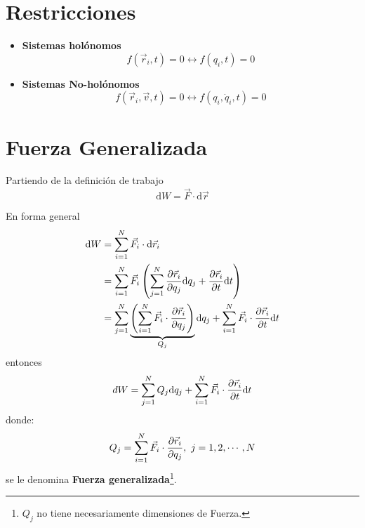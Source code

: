 \documentclass[../main]{subfiles}
\begin{document}
\section{Restricciones}\label{sec5}
\begin{itemize}
    \item \textbf{Sistemas holónomos}
    \begin{equation}
        f(\vec{r}_i, t)=0 \leftrightarrow f(q_i, t)=0
    \end{equation}
    \item \textbf{Sistemas No-holónomos}
    \begin{equation}
        f(\vec{r}_i, \vec{v}, t)=0 \leftrightarrow f(q_i, \dot{q}_i, t)=0
    \end{equation}
\end{itemize}

\section{Fuerza Generalizada}\label{sec6}

Partiendo de la definición de trabajo
\begin{equation}
    \mathrm{d}W=\vec{F}\cdot \mathrm{d}\vec{r}
\end{equation}

En forma general
\begin{equation}
    \begin{split}
        \mathrm{d}W&=\sum_{i=1}^N \vec{F}_i \cdot \mathrm{d}\vec{r}_i \\
        &=\sum_{i=1}^N \vec{F}_i \left(\sum_{j=1}^N \pdv{\vec{r}_i}{q_j}\mathrm{d}q_j+\pdv{\vec{r}_i}{t}\mathrm{d}t\right)\\
        &=\sum_{j=1}^N \underbrace{\left(\sum_{i=1}^N \vec{F}_i \cdot \pdv{\vec{r}_i}{q_j}\right)}_{Q_j}\mathrm{d}q_j+\sum_{i=1}^N \vec{F}_i \cdot \pdv{\vec{r}_i}{t}\mathrm{d}t
    \end{split}
\end{equation}
entonces
\begin{equation}
    dW=\sum_{j=1}^N Q_j \mathrm{d}q_j+\sum_{i=1}^N \vec{F}_i\cdot \pdv{\vec{r}_i}{t}\mathrm{d}t
\end{equation}
donde:
\begin{equation}
    Q_j=\sum_{i=1}^N \vec{F}_i \cdot \pdv{\vec{r}_i}{q_j}, \ j=1,2,\cdots, N
\end{equation}
se le denomina \textbf{Fuerza generalizada}\footnote{$Q_j$ no tiene necesariamente dimensiones de Fuerza.}.
\end{document}
